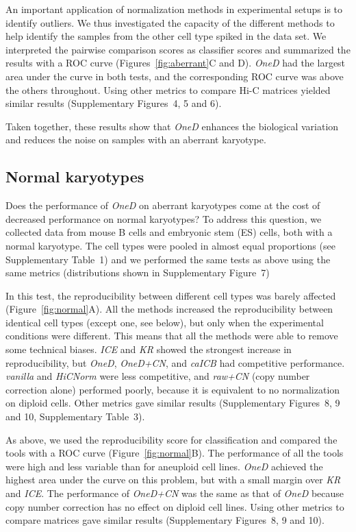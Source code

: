\documentclass[a4,center,fleqn]{NAR}
\providecommand{\DIFadd}[1]{{\protect\color{red}#1}} %
\providecommand{\DIFdel}[1]{{\protect}}                      %
\providecommand{\DIFaddbegin}{} %
\providecommand{\DIFaddend}{} %
\providecommand{\DIFdelbegin}{} %
\providecommand{\DIFdelend}{} %
\begin{document}
An important application of normalization methods in experimental setups
is to identify outliers. We thus investigated the capacity of the
different methods to help identify the samples from the other cell type
spiked in the data set. We interpreted the pairwise comparison scores as
classifier scores and summarized the results with a ROC curve
(Figures~\ref{fig:aberrant}C and D). \textit{OneD} had the largest area
under the curve in both tests, and the corresponding ROC curve was above
the others throughout. Using other metrics to compare Hi-C matrices
yielded similar results (Supplementary Figures~4, 5 and 6).

Taken together, these results show that \textit{OneD} enhances the
biological variation and reduces the noise on samples with an aberrant
karyotype.




\subsection{Normal karyotypes}

Does the performance of \textit{OneD} on aberrant karyotypes come at the
cost of decreased performance on normal karyotypes? To address this
question, we collected data from mouse B cells and embryonic stem (ES)
cells, both with a normal karyotype. The cell types were pooled in almost
equal proportions (see Supplementary Table~1) and we performed the same
tests as above using the same metrics (distributions shown in
Supplementary Figure~7)

In this test, the reproducibility between different cell types was barely
affected (Figure~\ref{fig:normal}A). All the methods increased the
reproducibility between identical cell types (except one, see below), but
only when the experimental conditions were different. This means that all
the methods were able to remove some technical biases. \textit{ICE} and
\textit{KR} showed the strongest increase in reproducibility, but
\textit{OneD}, \textit{OneD+CN}, and \textit{caICB} had competitive
performance. \textit{vanilla} and \textit{\DIFdelbegin \DIFdel{LGF}\DIFdelend \DIFaddbegin \DIFadd{HiCNorm}\DIFaddend } were less competitive, and
\textit{raw+CN} (copy number correction alone) performed poorly, because
it is equivalent to no normalization on diploid cells. Other metrics gave
similar results (Supplementary Figures~8, 9 and 10, Supplementary Table~3).

As above, we used the reproducibility score for classification and
compared the tools with a ROC curve (Figure~\ref{fig:normal}B). The
performance of all the tools were high and less variable than for
aneuploid cell lines. \textit{OneD} achieved the highest area under the
curve on this problem, but with a small margin over \textit{KR} and
\textit{ICE}. The performance of \textit{OneD+CN} was the same as that of
\textit{OneD} because copy number correction has no effect on diploid cell
lines. Using other metrics to compare matrices gave similar results
(Supplementary Figures~8, 9 and 10).
\end{document}
